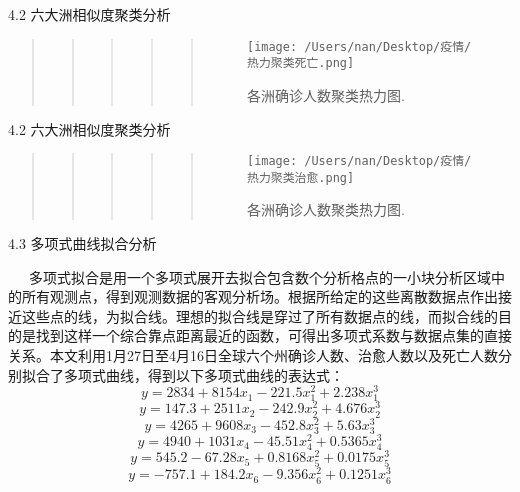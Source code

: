 \documentclass[
  ignorenonframetext,
]{beamer}
\begin{document}
\begin{frame}{4.2 六大洲相似度聚类分析}
\protect\hypertarget{section-32}{}

\begin{quote}
\begin{quote}
\begin{quote}
\begin{quote}
\begin{quote}
\begin{figure}
\centering
\texttt{[image: /Users/nan/Desktop/疫情/热力聚类死亡.png]}
\caption{各洲确诊人数聚类热力图.}
\end{figure}
\end{quote}
\end{quote}
\end{quote}
\end{quote}
\end{quote}

\end{frame}

\begin{frame}{4.2 六大洲相似度聚类分析}
\protect\hypertarget{section-33}{}

\begin{quote}
\begin{quote}
\begin{quote}
\begin{quote}
\begin{quote}
\begin{figure}
\centering
\texttt{[image: /Users/nan/Desktop/疫情/热力聚类治愈.png]}
\caption{各洲确诊人数聚类热力图.}
\end{figure}
\end{quote}
\end{quote}
\end{quote}
\end{quote}
\end{quote}

\end{frame}

\begin{frame}{4.3 多项式曲线拟合分析}
\protect\hypertarget{section-34}{}

  多项式拟合是用一个多项式展开去拟合包含数个分析格点的一小块分析区域中的所有观测点，得到观测数据的客观分析场。根据所给定的这些离散数据点作出接近这些点的线，为拟合线。理想的拟合线是穿过了所有数据点的线，而拟合线的目的是找到这样一个综合靠点距离最近的函数，可得出多项式系数与数据点集的直接关系。本文利用1月27日至4月16日全球六个州确诊人数、治愈人数以及死亡人数分别拟合了多项式曲线，得到以下多项式曲线的表达式：
\[y=2834+8154x_1-221.5x_1^2+2.238x_1^3\]
\[y=147.3+2511x_2-242.9x_2^2+4.676x_2^3\]
\[y=4265+9608x_3-452.8x_3^2+5.63x_3^3\]
\[y=4940+1031x_4-45.51x_4^2+0.5365x_4^3\]
\[y=545.2-67.28x_5+0.8168x_5^2+0.0175x_5^3\]
\[y=-757.1+184.2x_6-9.356x_6^2+0.1251x_6^3\]

\end{frame}
\end{document}
